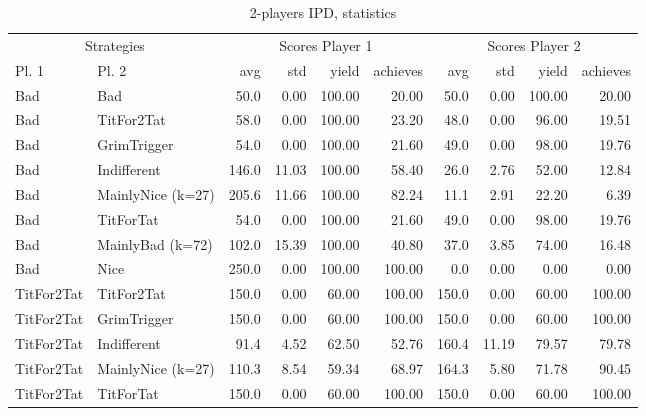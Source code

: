 \documentclass[journal,a4paper,10pt,twoside]{IEEEtran} %
\begin{document}
\begin{table}[ht]
	\caption{2-players IPD, statistics}
	\label{tab:ipd2p}
	\centering
	\begin{tabular}{ll|rrrr|rrrr}	\toprule
		\multicolumn{2}{c}{Strategies}        & \multicolumn{4}{c}{Scores Player 1} & \multicolumn{4}{c}{Scores Player 2} \\
		Pl. 1             & Pl. 2             &   avg &   std &  yield &   achieves &   avg &   std &  yield &   achieves \\ \midrule
		Bad               & Bad               &  50.0 &  0.00 & 100.00 &      20.00 &  50.0 &  0.00 & 100.00 &      20.00 \\
		Bad               & TitFor2Tat        &  58.0 &  0.00 & 100.00 &      23.20 &  48.0 &  0.00 &  96.00 &      19.51 \\
		Bad               & GrimTrigger       &  54.0 &  0.00 & 100.00 &      21.60 &  49.0 &  0.00 &  98.00 &      19.76 \\
		Bad               & Indifferent       & 146.0 & 11.03 & 100.00 &      58.40 &  26.0 &  2.76 &  52.00 &      12.84 \\
		Bad               & MainlyNice (k=27) & 205.6 & 11.66 & 100.00 &      82.24 &  11.1 &  2.91 &  22.20 &       6.39 \\
		Bad               & TitForTat         &  54.0 &  0.00 & 100.00 &      21.60 &  49.0 &  0.00 &  98.00 &      19.76 \\
		Bad               & MainlyBad (k=72)  & 102.0 & 15.39 & 100.00 &      40.80 &  37.0 &  3.85 &  74.00 &      16.48 \\
		Bad               & Nice              & 250.0 &  0.00 & 100.00 &     100.00 &   0.0 &  0.00 &   0.00 &       0.00 \\
		TitFor2Tat        & TitFor2Tat        & 150.0 &  0.00 &  60.00 &     100.00 & 150.0 &  0.00 &  60.00 &     100.00 \\
		TitFor2Tat        & GrimTrigger       & 150.0 &  0.00 &  60.00 &     100.00 & 150.0 &  0.00 &  60.00 &     100.00 \\
		TitFor2Tat        & Indifferent       &  91.4 &  4.52 &  62.50 &      52.76 & 160.4 & 11.19 &  79.57 &      79.78 \\
		TitFor2Tat        & MainlyNice (k=27) & 110.3 &  8.54 &  59.34 &      68.97 & 164.3 &  5.80 &  71.78 &      90.45 \\
		TitFor2Tat        & TitForTat         & 150.0 &  0.00 &  60.00 &     100.00 & 150.0 &  0.00 &  60.00 &     100.00 \\

\end{tabular}
\end{table}
\end{document}
